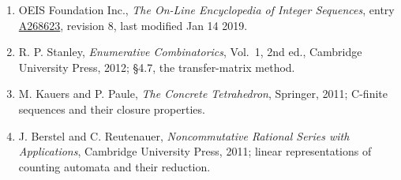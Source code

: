 \documentclass[11pt]{article}
\theoremstyle{definition}
\begin{document}
\begin{enumerate}

\item OEIS Foundation Inc., \emph{The On-Line Encyclopedia of Integer Sequences}, entry \href{https://oeis.org/A268623}{A268623}, revision 8, last modified Jan 14 2019.

\item R. P. Stanley, \emph{Enumerative Combinatorics}, Vol.~1, 2nd ed., Cambridge University Press, 2012; \S4.7, the transfer-matrix method.

\item M. Kauers and P. Paule, \emph{The Concrete Tetrahedron}, Springer, 2011; C-finite sequences and their closure properties.

\item J. Berstel and C. Reutenauer, \emph{Noncommutative Rational Series with Applications}, Cambridge University Press, 2011; linear representations of counting automata and their reduction.

\end{enumerate}
\end{document}
